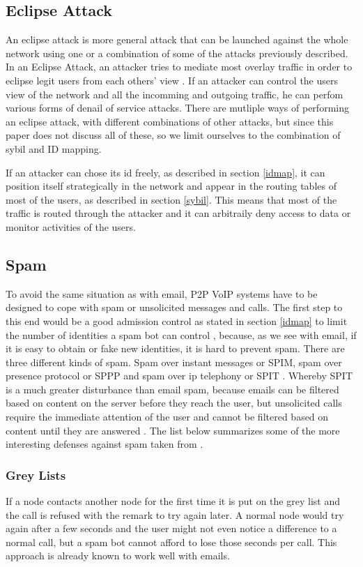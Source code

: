 \documentclass[a4paper,conference]{IEEEtran}
\begin{document}
\subsection{Eclipse Attack}
\label{eclipse}
An eclipse attack is more general attack that can be launched against the whole network using one or a combination of some of the attacks previously described.
In an Eclipse Attack, an attacker tries to mediate most overlay traffic in order to eclipse legit users from each others’ view \cite{touceda}. If an attacker
can control the users view of the network and all the incomming and outgoing traffic, he can perfom various forms of denail of service attacks. There are
mutliple ways of performing an eclipse attack, with different combinations of other attacks, but since this paper does not discuss all of these, so we
limit ourselves to the combination of sybil and ID mapping.

If an attacker can chose its id freely, as described in section \ref{idmap}, it can position itself strategically in the network and appear in the routing
tables of most of the users, as described in section \ref{sybil}. This means that most of the traffic is routed through the attacker and it can arbitraily deny
access to data or monitor activities of the users.

\subsection{Spam}
\label{spam}
To avoid the same situation as with email, P2P VoIP systems have to be designed
to cope with spam or unsolicited messages and calls. The first step to this end
would be a good admission control as stated in section \ref{idmap} to limit the
number of identities a spam bot can control \cite{touceda}, because, as we see
with email,
if it is easy to obtain or fake new identities, it is hard to prevent spam.
There are three different kinds of spam. Spam over instant messages or SPIM,
spam over
presence protocol or SPPP and spam over ip telephony or SPIT \cite{touceda}.
Whereby SPIT is a much greater disturbance than email spam, because emails can
be filtered based on content on the server before they reach the user, but
unsolicited calls require the immediate attention of the user and cannot be
filtered
based on content until they are answered \cite{heikkilae}. The list below
summarizes some of the more interesting defenses against spam taken from
\cite{touceda}.

\subsubsection{Grey Lists}
If a node contacts another node for the first time it is put on the grey list
and the call is refused with the remark to try again later.
A normal node would try again after a few seconds and the user might not even
notice a difference to a normal call, but a spam bot cannot afford to lose those
seconds per call.
This approach is already known to work well with emails.
\end{document}
